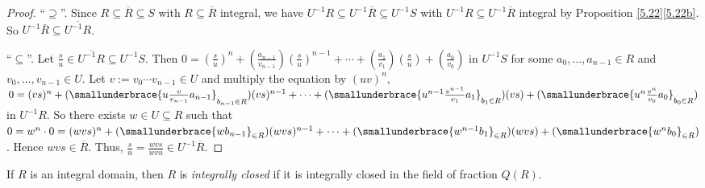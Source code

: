 \begin{proof}
    ``$\supseteq$''. Since $R \subseteq \overbar{R} \subseteq S$ with $R \subseteq \overbar{R}$ integral, we have $U^{-1}R \subseteq U^{-1}\overbar{R} \subseteq U^{-1}S$ with $U^{-1}R \subseteq U^{-1}\overbar{R}$ integral by Proposition \ref{5.22}\ref{5.22b}. So $U^{-1} \overbar{R} \subseteq \overbar{U^{-1}R}$. \par 
    ``$\subseteq$''. Let $\frac{s}{u} \in \overbar{U^{-1}R} \subseteq U^{-1}S$. Then $0 = (\frac{s}{u})^{n} + (\frac{a_{n-1}}{v_{n-1}})(\frac{s}{u})^{n-1} + \cdots + (\frac{a_1}{v_1})(\frac{s}{u}) + (\frac{a_0}{v_0})$ in $U^{-1}S$ for some $a_0,\ldots,a_{n-1} \in R$ and $v_0,\ldots,v_{n-1} \in U$. Let $v := v_0 \cdots v_{n-1} \in U$ and multiply the equation by $(uv)^{n}$, $0 = (vs)^{n} + (\smallunderbrace{u\frac{v}{v_{n-1}}a_{n-1}}_{b_{n-1} \in R})(vs)^{n-1} + \cdots + (\smallunderbrace{u^{n-1} \frac{v^{n-1}}{v_1}a_1}_{b_1 \in R})(vs) + (\smallunderbrace{u^{n}\frac{v^{n}}{v_0}a_0}_{b_0 \in R})$ in $U^{-1}R$. So there exists $w \in U \subseteq R$ such that $0 = w^n \cdot 0 = (wvs)^{n} + (\smallunderbrace{wb_{n-1}}_{\in R})(wvs)^{n-1} + \cdots + (\smallunderbrace{w^{n-1}b_1}_{\in R})(wvs) + (\smallunderbrace{w^{n}b_0}_{\in R})$. Hence $wvs \in \overbar{R}$. Thus, $\frac{s}{u} = \frac{wvs}{wvu} \in U^{-1}\overbar{R}$.
\end{proof}

\begin{definition}\label{5.31}
    If $R$ is an integral domain, then $R$ is \emph{integrally closed} if it is integrally closed in the field of fraction $Q(R)$. 
\end{definition}

